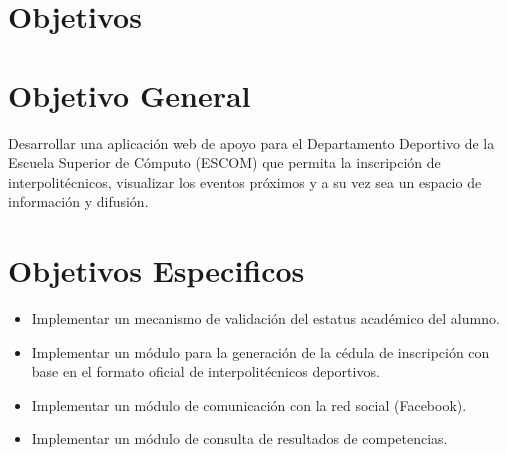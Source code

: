	\section{Objetivos}
	\section{Objetivo General}
	Desarrollar una aplicación web de apoyo para el Departamento Deportivo de la Escuela Superior de Cómputo (ESCOM) que permita la inscripción de interpolitécnicos, visualizar los eventos próximos y a su vez sea un espacio de información y difusión.
	\section{Objetivos Especificos}
	\begin{itemize}
		\item Implementar un mecanismo de validación del estatus académico del alumno. 
		\item Implementar un módulo para la generación de la cédula de inscripción con base en el formato oficial de interpolitécnicos deportivos. 
		\item Implementar un módulo de comunicación con la red social (Facebook). 
		\item Implementar un módulo de consulta de resultados de competencias.
	\end{itemize}